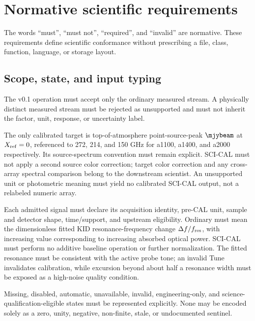 \section{Normative scientific requirements}
\label{sec:requirements}

The words ``must'', ``must not'', ``required'', and ``invalid'' are normative.
These requirements define scientific conformance without prescribing a file,
class, function, language, or storage layout.

\subsection{Scope, state, and input typing}

\begin{description}[style=nextline]
\item[\Req{001}: measured-channel scope.]
  The v0.1 operation must accept only the ordinary  measured stream.
  A physically distinct measured stream must be rejected as unsupported and
  must not inherit the  factor, unit, response, or uncertainty label.

\item[\Req{002}: target-unit scope.]
  The only calibrated target is top-of-atmosphere point-source-peak
  \(\mjybeam\) at \(X_{\rm ref}=0\), referenced to 272, 214, and 150 GHz for
  a1100, a1400, and a2000 respectively. Its source-spectrum convention must
  remain explicit. SCI-CAL must not apply a second source color correction;
  target color correction and any cross-array spectral comparison belong to
  the downstream scientist. An unsupported unit or photometric meaning must
  yield no calibrated SCI-CAL output, not a relabeled numeric array.

\item[\Req{003}: complete signal declaration.]
  Each admitted signal must declare its acquisition identity, pre-CAL unit,
  sample and detector shape, time/support, and upstream eligibility. Ordinary
   must mean the dimensionless fitted KID resonance-frequency change
  \(\Delta f/f_{\rm res}\), with increasing value corresponding to increasing
  absorbed optical power. SCI-CAL must perform no additive baseline operation
  or further normalization. The fitted resonance must be consistent with the
  active probe tone; an invalid Tune invalidates calibration, while excursion
  beyond about half a resonance width must be exposed as a high-noise quality
  condition.

\item[\Req{004}: explicit semantic states.]
  Missing, disabled, automatic, unavailable, invalid, engineering-only, and
  science-qualification-eligible states must be represented explicitly. None
  may be encoded solely as a zero, unity, negative, non-finite, stale, or
  undocumented sentinel.


\end{description}

